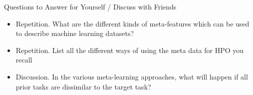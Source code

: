 \begin{frame}[c]{Questions to Answer for Yourself / Discuss with Friends}

\begin{itemize}
    \item \alert{Repetition.} What are the different kinds of meta-features which can be used to describe machine learning datasets?
    
    \medskip

    \item \alert{Repetition.} List all the different ways of using the meta data for HPO you recall
    \medskip

    \item \alert{Discussion.}
        In the various meta-learning approaches, what will happen if all prior tasks are dissimilar to the target task?


\end{itemize}

\end{frame}